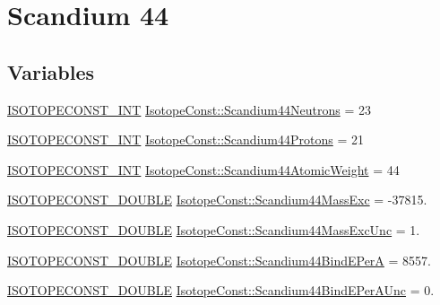 \hypertarget{group___isotope_const-_scandium-_sc44}{}\section{Scandium 44}
\label{group___isotope_const-_scandium-_sc44}
\subsection*{Variables}
\begin{DoxyCompactItemize}
\item 
\mbox{\hyperlink{group___isotope_const-_macros_ga5f18360b3e99483a35c32d789e62621c}{I\+S\+O\+T\+O\+P\+E\+C\+O\+N\+S\+T\+\_\+\+I\+NT}} \mbox{\hyperlink{group___isotope_const-_scandium-_sc44_ga62582b7ac95997bd7b01f39fcdba43f9}{Isotope\+Const\+::\+Scandium44\+Neutrons}} = 23
\item 
\mbox{\hyperlink{group___isotope_const-_macros_ga5f18360b3e99483a35c32d789e62621c}{I\+S\+O\+T\+O\+P\+E\+C\+O\+N\+S\+T\+\_\+\+I\+NT}} \mbox{\hyperlink{group___isotope_const-_scandium-_sc44_ga664d545f549f194064f6cd6187f7a549}{Isotope\+Const\+::\+Scandium44\+Protons}} = 21
\item 
\mbox{\hyperlink{group___isotope_const-_macros_ga5f18360b3e99483a35c32d789e62621c}{I\+S\+O\+T\+O\+P\+E\+C\+O\+N\+S\+T\+\_\+\+I\+NT}} \mbox{\hyperlink{group___isotope_const-_scandium-_sc44_gab3282a116fa46f5f1a032f9baa208221}{Isotope\+Const\+::\+Scandium44\+Atomic\+Weight}} = 44
\item 
\mbox{\hyperlink{group___isotope_const-_macros_ga8f45a7272ce02c0b4c65c44636ed719a}{I\+S\+O\+T\+O\+P\+E\+C\+O\+N\+S\+T\+\_\+\+D\+O\+U\+B\+LE}} \mbox{\hyperlink{group___isotope_const-_scandium-_sc44_ga5975b2500b8f6c762053f651af386b1a}{Isotope\+Const\+::\+Scandium44\+Mass\+Exc}} = -\/37815.
\item 
\mbox{\hyperlink{group___isotope_const-_macros_ga8f45a7272ce02c0b4c65c44636ed719a}{I\+S\+O\+T\+O\+P\+E\+C\+O\+N\+S\+T\+\_\+\+D\+O\+U\+B\+LE}} \mbox{\hyperlink{group___isotope_const-_scandium-_sc44_ga707bc2cf7d4140f1cdea690db144c3fd}{Isotope\+Const\+::\+Scandium44\+Mass\+Exc\+Unc}} = 1.
\item 
\mbox{\hyperlink{group___isotope_const-_macros_ga8f45a7272ce02c0b4c65c44636ed719a}{I\+S\+O\+T\+O\+P\+E\+C\+O\+N\+S\+T\+\_\+\+D\+O\+U\+B\+LE}} \mbox{\hyperlink{group___isotope_const-_scandium-_sc44_ga52e36f198b0723b56e323f020991d89e}{Isotope\+Const\+::\+Scandium44\+Bind\+E\+PerA}} = 8557.
\item 
\mbox{\hyperlink{group___isotope_const-_macros_ga8f45a7272ce02c0b4c65c44636ed719a}{I\+S\+O\+T\+O\+P\+E\+C\+O\+N\+S\+T\+\_\+\+D\+O\+U\+B\+LE}} \mbox{\hyperlink{group___isotope_const-_scandium-_sc44_gab55351cc04066145e20d4f341255f720}{Isotope\+Const\+::\+Scandium44\+Bind\+E\+Per\+A\+Unc}} = 0.

\end{DoxyCompactItemize}
